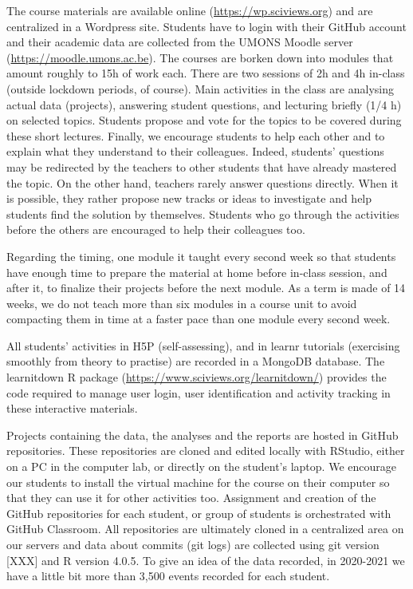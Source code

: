 \documentclass{aims}
\theoremstyle{definition}
\begin{document}
The course materials are available online
(\url{https://wp.sciviews.org}) and are centralized in a Wordpress site.
Students have to login with their GitHub account and their academic data
are collected from the UMONS Moodle server
(\url{https://moodle.umons.ac.be}). The courses are borken down into
modules that amount roughly to 15h of work each. There are two sessions
of 2h and 4h in-class (outside lockdown periods, of course). Main
activities in the class are analysing actual data (projects), answering
student questions, and lecturing briefly (1/4 h) on selected topics.
Students propose and vote for the topics to be covered during these
short lectures. Finally, we encourage students to help each other and to
explain what they understand to their colleagues. Indeed, students'
questions may be redirected by the teachers to other students that have
already mastered the topic. On the other hand, teachers rarely answer
questions directly. When it is possible, they rather propose new tracks
or ideas to investigate and help students find the solution by
themselves. Students who go through the activities before the others are
encouraged to help their colleagues too.

Regarding the timing, one module it taught every second week so that
students have enough time to prepare the material at home before
in-class session, and after it, to finalize their projects before the
next module. As a term is made of 14 weeks, we do not teach more than
six modules in a course unit to avoid compacting them in time at a
faster pace than one module every second week.

All students' activities in H5P (self-assessing), and in learnr
tutorials (exercising smoothly from theory to practise) are recorded in
a MongoDB database. The learnitdown R package
(\url{https://www.sciviews.org/learnitdown/}) provides the code required
to manage user login, user identification and activity tracking in these
interactive materials.

Projects containing the data, the analyses and the reports are hosted in
GitHub repositories. These repositories are cloned and edited locally
with RStudio, either on a PC in the computer lab, or directly on the
student's laptop. We encourage our students to install the virtual
machine for the course on their computer so that they can use it for
other activities too. Assignment and creation of the GitHub repositories
for each student, or group of students is orchestrated with GitHub
Classroom. All repositories are ultimately cloned in a centralized area
on our servers and data about commits (git logs) are collected using git
version {[}XXX{]} and R version 4.0.5. To give an idea of the data
recorded, in 2020-2021 we have a little bit more than 3,500 events
recorded for each student.
\end{document}
